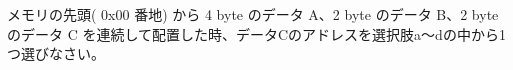 メモリの先頭( 0x00 番地) から 4 byte のデータ A、2 byte のデータ B、2 byte のデータ C を連続して配置した時、データCのアドレスを選択肢a〜dの中から1つ選びなさい。
